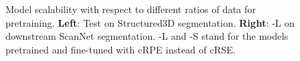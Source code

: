 \documentclass[10pt,twocolumn,letterpaper]{article}
\begin{document}
\begin{figure}[t]

    \caption{Model scalability with respect to different ratios of data for pretraining. \textbf{Left}: Test on Structured3D segmentation. \textbf{Right}: \SST-L on downstream ScanNet segmentation. \SST-L and \SST-S stand for the models pretrained and fine-tuned with cRPE instead of cRSE.}
    \label{fig:modelscale} \end{figure}


\begin{figure}[t]
    \centering


\end{figure}
\end{document}
